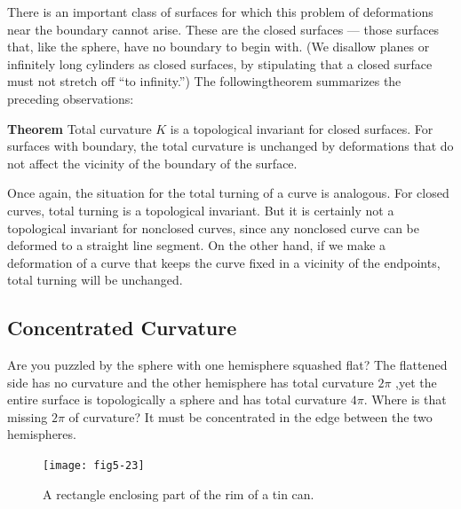 \documentclass{book}
\begin{document}
There is an important class of surfaces for which this problem of
deformations near the boundary cannot arise. These are the closed
surfaces --- those surfaces that, like the sphere, have no boundary to begin
with. (We disallow planes or infinitely long cylinders as closed surfaces,
by stipulating that a closed surface must not stretch off ``to infinity.'')
The followingtheorem summarizes the preceding observations:

\noindent \textbf{Theorem} Total curvature $K$ is a topological invariant for closed surfaces.
For surfaces with boundary, the total curvature is unchanged by deformations that do not affect the vicinity of the boundary of the surface.

Once again, the situation for the total turning of a curve is analogous.
For closed curves, total turning is a topological invariant. But it is
certainly not a topological invariant for nonclosed curves, since any
nonclosed curve can be deformed to a straight line segment. On the
other hand, if we make a deformation of a curve that keeps the curve
fixed in a vicinity of the endpoints, total turning will be unchanged.

\subsection{Concentrated Curvature}

Are you puzzled by the sphere with one hemisphere squashed flat? The
flattened side has no curvature and the other hemisphere has total
curvature $2 \pi$ ,yet the entire surface is topologically a sphere and has
total curvature $4 \pi$. Where is that missing $2 \pi$ of curvature? It must be
concentrated in the edge between the two hemispheres.

\begin{figure}
\begin{center}
\texttt{[image: fig5-23]}
\caption{A rectangle enclosing part of the rim of a tin can.}
\end{center}
\end{figure}
\end{document}
